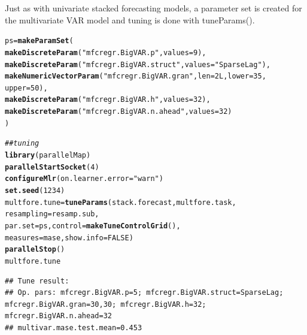 \documentclass[12pt]{article}\usepackage[]{graphicx}\usepackage[]{color}
\makeatletter
\newcommand{\hlnum}[1]{\textcolor[rgb]{0.686,0.059,0.569}{#1}}%
\newcommand{\hlstr}[1]{\textcolor[rgb]{0.192,0.494,0.8}{#1}}%
\newcommand{\hlcom}[1]{\textcolor[rgb]{0.678,0.584,0.686}{\textit{#1}}}%
\newcommand{\hlstd}[1]{\textcolor[rgb]{0.345,0.345,0.345}{#1}}%
\newcommand{\hlkwb}[1]{\textcolor[rgb]{0.69,0.353,0.396}{#1}}%
\newcommand{\hlkwc}[1]{\textcolor[rgb]{0.333,0.667,0.333}{#1}}%
\newcommand{\hlkwd}[1]{\textcolor[rgb]{0.737,0.353,0.396}{\textbf{#1}}}%
\newenvironment{kframe}{%
 \def\at@end@of@kframe{}%
 \ifinner\ifhmode%
  \def\at@end@of@kframe{\end{minipage}}%
  \begin{minipage}{\columnwidth}%
 \fi\fi%
 \def\FrameCommand##1{\hskip\@totalleftmargin \hskip-\fboxsep
 \colorbox{shadecolor}{##1}\hskip-\fboxsep
     \hskip-\linewidth \hskip-\@totalleftmargin \hskip\columnwidth}%
 \MakeFramed {\advance\hsize-\width
   \@totalleftmargin\z@ \linewidth\hsize
   \@setminipage}}%
 {\par\unskip\endMakeFramed%
 \at@end@of@kframe}
\newenvironment{knitrout}{}{} %
\theoremstyle{definition}
\newcommand\code{\@codex}
\def\@codex#1{{\normalfont\ttfamily\hyphenchar\font=-1 #1}}
\makeatother
\begin{document}
Just as with univariate stacked forecasting models, a parameter set is created for the multivariate VAR model and tuning is done with \code{tuneParams()}.

\singlespacing
\begin{knitrout}
\color{fgcolor}\begin{kframe}
\begin{alltt}
\hlstd{ps} \hlkwb{=} \hlkwd{makeParamSet}\hlstd{(}
  \hlkwd{makeDiscreteParam}\hlstd{(}\hlstr{"mfcregr.BigVAR.p"}\hlstd{,} \hlkwc{values} \hlstd{=} \hlnum{9}\hlstd{),}
  \hlkwd{makeDiscreteParam}\hlstd{(}\hlstr{"mfcregr.BigVAR.struct"}\hlstd{,} \hlkwc{values} \hlstd{=} \hlstr{"SparseLag"}\hlstd{),}
  \hlkwd{makeNumericVectorParam}\hlstd{(}\hlstr{"mfcregr.BigVAR.gran"}\hlstd{,} \hlkwc{len} \hlstd{=} \hlnum{2L}\hlstd{,} \hlkwc{lower} \hlstd{=} \hlnum{35}\hlstd{,}
                         \hlkwc{upper} \hlstd{=} \hlnum{50}\hlstd{),}
  \hlkwd{makeDiscreteParam}\hlstd{(}\hlstr{"mfcregr.BigVAR.h"}\hlstd{,} \hlkwc{values} \hlstd{=} \hlnum{32}\hlstd{),}
  \hlkwd{makeDiscreteParam}\hlstd{(}\hlstr{"mfcregr.BigVAR.n.ahead"}\hlstd{,} \hlkwc{values} \hlstd{=} \hlnum{32}\hlstd{)}
\hlstd{)}

\hlcom{## tuning}
\hlkwd{library}\hlstd{(parallelMap)}
\hlkwd{parallelStartSocket}\hlstd{(}\hlnum{4}\hlstd{)}
\hlkwd{configureMlr}\hlstd{(}\hlkwc{on.learner.error} \hlstd{=} \hlstr{"warn"}\hlstd{)}
\hlkwd{set.seed}\hlstd{(}\hlnum{1234}\hlstd{)}
\hlstd{multfore.tune} \hlkwb{=} \hlkwd{tuneParams}\hlstd{(stack.forecast, multfore.task,}
                           \hlkwc{resampling} \hlstd{= resamp.sub,}
                           \hlkwc{par.set} \hlstd{= ps,} \hlkwc{control} \hlstd{=} \hlkwd{makeTuneControlGrid}\hlstd{(),}
                           \hlkwc{measures} \hlstd{= mase,} \hlkwc{show.info} \hlstd{=} \hlnum{FALSE}\hlstd{)}
\hlkwd{parallelStop}\hlstd{()}
\hlstd{multfore.tune}
\end{alltt}
\end{kframe}
\end{knitrout}

\begin{knitrout}
\color{fgcolor}\begin{kframe}
\begin{verbatim}
## Tune result:
## Op. pars: mfcregr.BigVAR.p=5; mfcregr.BigVAR.struct=SparseLag; mfcregr.BigVAR.gran=30,30; mfcregr.BigVAR.h=32; mfcregr.BigVAR.n.ahead=32
## multivar.mase.test.mean=0.453
\end{verbatim}
\end{kframe}
\end{knitrout}
\doublespacing
\end{document}
